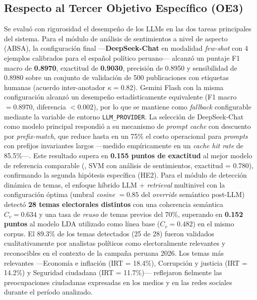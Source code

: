 \documentclass[listof=nochaptergap,12pt,times,authoryear]{report}
\let\cite\textcite
\begin{document}
\subsection*{Respecto al Tercer Objetivo Específico (OE3)}
Se evaluó con rigurosidad el desempeño de los LLMs en las dos tareas principales
del sistema. Para el módulo de análisis de sentimientos a nivel de aspecto (ABSA),
la configuración final —\textbf{DeepSeek-Chat} en modalidad \textit{few-shot} con 4
ejemplos calibrados para el español político peruano— alcanzó un puntaje F1 macro
de \textbf{0.8970}, exactitud de \textbf{0.9030}, precisión de 0.8950 y
sensibilidad de 0.8980 sobre un conjunto de validación de 500 publicaciones con
etiquetas humanas (acuerdo inter-anotador $\kappa = 0.82$). Gemini Flash con la
misma configuración alcanzó un desempeño estadísticamente equivalente
(F1 macro $= 0.8970$, diferencia $< 0.002$), por lo que se mantiene como
\textit{fallback} configurable mediante la variable de entorno
\texttt{LLM\_PROVIDER}. La selección de DeepSeek-Chat como modelo principal
respondió a su mecanismo de \textit{prompt cache} con descuento por
\textit{prefix-match}, que reduce hasta en un 75\% el costo operacional para
\textit{prompts} con prefijos invariantes largos —medido empíricamente en un
\textit{cache hit rate} de 85.5\%—. Este resultado supera en \textbf{0.155 puntos
de exactitud} al mejor modelo de referencia comparable
(\cite{pr_alvi2023twitter_election_review}, SVM con análisis de sentimientos,
exactitud = 0.780), confirmando la segunda hipótesis específica (HE2).
Para el módulo de detección dinámica de temas, el enfoque híbrido LLM +
\textit{retrieval} multinivel con la configuración óptima (umbral \textit{cosine}
$= 0.85$ del \textit{override} semántico post-LLM) detectó \textbf{28 temas
electorales distintos} con una coherencia semántica $C_v = 0.634$ y una tasa de
\textit{reuso} de temas previos del 70\%, superando en \textbf{0.152 puntos} al
modelo LDA utilizado como línea base ($C_v = 0.482$) en el mismo corpus. El 89.3\% de los temas detectados (25 de 28) fueron validados
cualitativamente por analistas políticos como electoralmente relevantes y
reconocibles en el contexto de la campaña peruana 2026. Los temas más relevantes
—Economía e inflación (IRT = 18.4\%), Corrupción y justicia (IRT = 14.2\%) y
Seguridad ciudadana (IRT = 11.7\%)— reflejaron fielmente las preocupaciones
ciudadanas expresadas en los medios y en las redes sociales durante el período
analizado.
\end{document}
